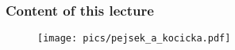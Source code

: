 \begin{frame}[fragile]
\frametitle{Content of this lecture}
	\begin{figure}[h]
	\texttt{[image: pics/pejsek\_a\_kocicka.pdf]}
	\end{figure}
\end{frame}
